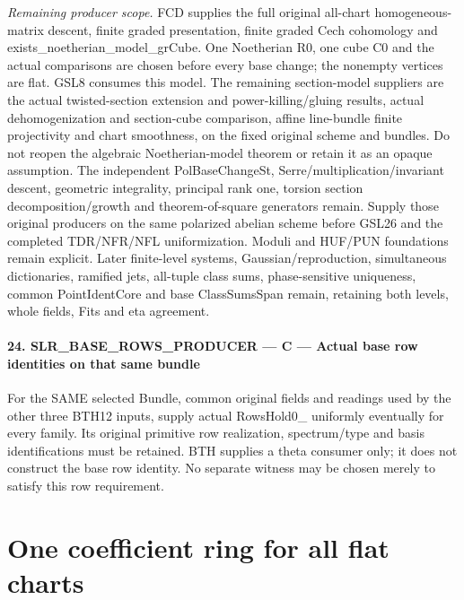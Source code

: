 \documentclass[11pt,a4paper]{article}
\numberwithin{equation}{section}
\theoremstyle{remark}\newtheorem{remark}[theorem]{Remark}
\begin{document}
\emph{Remaining producer scope.} FCD supplies the full original all-chart homogeneous-matrix descent, finite graded presentation, finite graded Cech cohomology and exists\_\allowbreak noetherian\_\allowbreak model\_\allowbreak grCube. One Noetherian R0, one cube C0 and the actual comparisons are chosen before every base change; the nonempty vertices are flat. GSL8 consumes this model. The remaining section-model suppliers are the actual twisted-section extension and power-killing/gluing results, actual dehomogenization and section-cube comparison, affine line-bundle finite projectivity and chart smoothness, on the fixed original scheme and bundles. Do not reopen the algebraic Noetherian-model theorem or retain it as an opaque assumption. The independent PolBaseChangeSt, Serre/multiplication/invariant descent, geometric integrality, principal rank one, torsion section decomposition/growth and theorem-of-square generators remain. Supply those original producers on the same polarized abelian scheme before GSL26 and the completed TDR/NFR/NFL uniformization. Moduli and HUF/PUN foundations remain explicit. Later finite-level systems, Gaussian/reproduction, simultaneous dictionaries, ramified jets, all-tuple class sums, phase-sensitive uniqueness, common PointIdentCore and base ClassSumsSpan remain, retaining both levels, whole fields, Fits and eta agreement.



\paragraph{24. SLR\_\allowbreak BASE\_\allowbreak ROWS\_\allowbreak PRODUCER — C — Actual base row identities on that same bundle}

For the SAME selected Bundle, common original fields and readings used by the other three BTH12 inputs, supply actual RowsHold0\_ uniformly eventually for every family. Its original primitive row realization, spectrum/type and basis identifications must be retained. BTH supplies a theta consumer only; it does not construct the base row identity. No separate witness may be chosen merely to satisfy this row requirement.



\clearpage
\section{One coefficient ring for all flat charts}
\label{sec:flat-chart-descent-v053}
\end{document}
